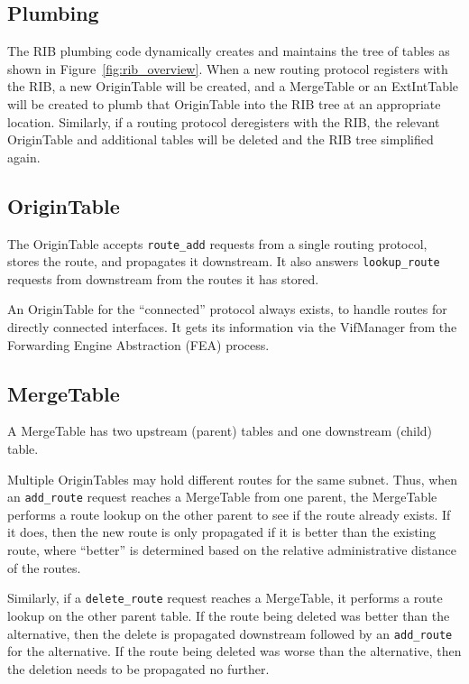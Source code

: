 \documentclass[11pt]{article}
\begin{document}
\subsection{Plumbing}

The RIB plumbing code dynamically creates and maintains the tree of
tables as shown in Figure~\ref{fig:rib_overview}.  When a new routing protocol
registers with the RIB, a new OriginTable will be created, and a
MergeTable or an ExtIntTable will be created to plumb that OriginTable
into the RIB tree at an appropriate location.  Similarly, if a routing
protocol deregisters with the RIB, the relevant OriginTable and
additional tables will be deleted and the RIB tree simplified again.

\subsection{OriginTable}

The OriginTable accepts {\tt route\_add} requests from a single routing
protocol, stores the route, and propagates it downstream.  It also
answers {\tt lookup\_route} requests from downstream from the routes it
has stored.

An OriginTable for the ``connected'' protocol always exists, to handle
routes for directly connected interfaces.  It gets its information
via the VifManager from the Forwarding Engine Abstraction (FEA)
process.

\subsection{MergeTable}

A MergeTable has two upstream (parent) tables and one downstream
(child) table.

Multiple OriginTables may hold different routes for the same subnet.
Thus, when an {\tt add\_route} request reaches a MergeTable from one
parent, the MergeTable performs a route lookup on the other parent to
see if the route already exists.  If it does, then the new route is
only propagated if it is better than the existing route, where
``better'' is determined based on the relative administrative distance
of the routes.

Similarly, if a {\tt delete\_route} request reaches a MergeTable, it
performs a route lookup on the other parent table.  If the route being
deleted was better than the alternative, then the delete is propagated
downstream followed by an {\tt add\_route} for the alternative.  If the
route being deleted was worse than the alternative, then the deletion
needs to be propagated no further.
\end{document}
